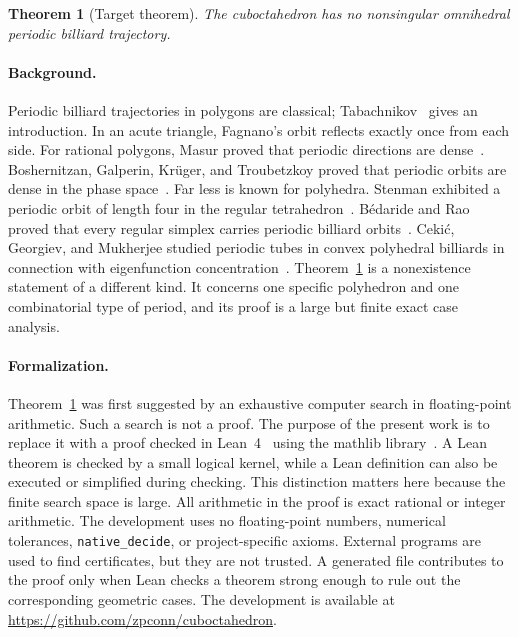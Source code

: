 \documentclass[11pt]{article}
\newtheorem{theorem}{Theorem}
\begin{document}
\begin{theorem}[Target theorem]\label{thm:target}
The cuboctahedron has no nonsingular omnihedral periodic billiard
trajectory.
\end{theorem}

\paragraph{Background.}
Periodic billiard trajectories in polygons are classical;
Tabachnikov~\cite{tabachnikov} gives an introduction.  In an acute triangle,
Fagnano's orbit reflects exactly once from each side.  For rational polygons,
Masur proved that periodic directions are dense~\cite{masur}.  Boshernitzan,
Galperin, Kr\"uger, and Troubetzkoy proved that periodic orbits are dense in
the phase space~\cite{bgkt}.  Far less is known for polyhedra.  Stenman
exhibited a periodic orbit of length four in the regular
tetrahedron~\cite{stenman}.  B\'edaride and Rao proved that every regular
simplex carries periodic billiard orbits~\cite{bedaride-rao}.  Ceki\'c,
Georgiev, and Mukherjee studied periodic tubes in convex polyhedral billiards
in connection with eigenfunction concentration~\cite{cekic-georgiev-mukherjee}.
Theorem~\ref{thm:target} is a nonexistence statement of a different kind.  It
concerns one specific polyhedron and one combinatorial type of period, and its
proof is a large but finite exact case analysis.

\paragraph{Formalization.}
Theorem~\ref{thm:target} was first suggested by an exhaustive computer search
in floating-point arithmetic.  Such a search is not a proof.  The purpose of
the present work is to replace it with a proof checked in
Lean~4~\cite{lean} using the mathlib library~\cite{mathlib}.  A Lean theorem
is checked by a small logical kernel, while a Lean definition can also be
executed or simplified during checking.  This distinction matters here
because the finite search space is large.  All arithmetic in the proof is
exact rational or integer arithmetic.  The development uses no floating-point
numbers, numerical tolerances, \texttt{native\_decide}, or project-specific
axioms.  External programs are used to find certificates, but they are not
trusted.  A generated file contributes to the proof only when Lean checks a
theorem strong enough to rule out the corresponding geometric cases.  The
development is available at
\url{https://github.com/zpconn/cuboctahedron}.
\end{document}
